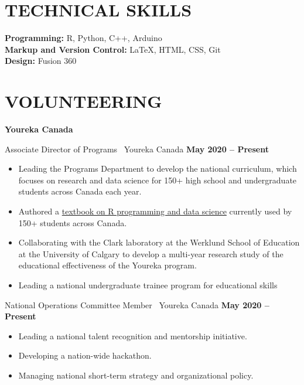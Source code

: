 \documentclass{article}
\begin{document}
\section*{\textcolor{my_colour}{TECHNICAL SKILLS}}
\vspace{-.25em} \hrulefill \vspace{.75em}

\textbf{Programming:} R, Python, C++, Arduino\\
\textbf{Markup and Version Control:} \LaTeX, HTML, CSS, Git\\
\textbf{Design:} Fusion 360


\section*{\textcolor{my_colour}{VOLUNTEERING}}
\vspace{-.25em} \hrulefill \vspace{.75em}

    \textbf{Youreka Canada}

    Associate Director of Programs \textbar\ Youreka Canada \hfill \textbf{May 2020 -- Present}
    \begin{itemize}
        \item Leading the Programs Department to develop the national curriculum, which focuses on research and data science for 150+ high school and undergraduate students across Canada each year.
        \item Authored a \href{https://youreka-textbook.netlify.app/}{textbook on R programming and data science} currently used by 150+ students across Canada.
        \item Collaborating with the Clark laboratory at the Werklund School of Education at the University of Calgary to develop a multi-year research study of the educational effectiveness of the Youreka program.
        \item Leading a national undergraduate trainee program for educational skills
    \end{itemize}

    National Operations Committee Member \textbar\ Youreka Canada \hfill \textbf{May 2020 -- Present}
    \begin{itemize}
        \item Leading a national talent recognition and mentorship initiative.
        \item Developing a nation-wide hackathon.
        \item Managing national short-term strategy and organizational policy.
    \end{itemize}
\end{document}
